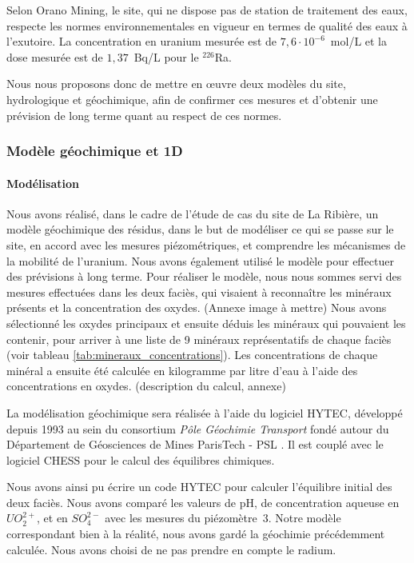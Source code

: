 \documentclass{article}
\begin{document}
Selon Orano Mining, le site, qui ne dispose pas de station de traitement des eaux, respecte les normes environnementales en vigueur en termes de qualité des eaux à l’exutoire. La concentration en uranium mesurée est de $7,6 \cdot 10^{-6}$~mol/L et la dose mesurée est de $1,37$~Bq/L pour le $^{226}$Ra.

Nous nous proposons donc de mettre en œuvre deux modèles du site, hydrologique et géochimique, afin de confirmer ces mesures et d’obtenir une prévision de long terme quant au respect de ces normes. 

\subsubsection{Modèle géochimique et 1D}
\paragraph{Modélisation}


Nous avons réalisé, dans le cadre de l’étude de cas du site de La Ribière, un modèle géochimique des résidus, dans le but de modéliser ce qui se passe sur le site, en accord avec les mesures piézométriques, et comprendre les mécanismes de la mobilité de l’uranium. Nous avons également utilisé le modèle pour effectuer des prévisions à long terme.
Pour réaliser le modèle, nous nous sommes servi des mesures effectuées dans les deux faciès, qui visaient à reconnaître les minéraux présents et la concentration des oxydes. (Annexe image à mettre) Nous avons sélectionné les oxydes principaux et ensuite déduis les minéraux qui pouvaient les contenir, pour arriver à une liste de 9 minéraux représentatifs de chaque faciès (voir tableau \ref{tab:mineraux_concentrations}). Les concentrations de chaque minéral a ensuite été calculée en kilogramme par litre d’eau à l’aide des concentrations en oxydes. (description du calcul, annexe) 


La modélisation géochimique sera réalisée à l'aide du logiciel HYTEC, développé depuis 1993 au sein du consortium \emph{Pôle Géochimie Transport} fondé autour du Département de Géosciences de Mines ParisTech - PSL \cite{site_hytec_hydrodynamique_nodate}. Il est couplé avec le logiciel CHESS \cite{lagneau:hal-00614306} pour le calcul des équilibres chimiques. 
	
Nous avons ainsi pu écrire un code HYTEC pour calculer l’équilibre initial des deux faciès. Nous avons comparé les valeurs de pH, de concentration aqueuse en $UO_2^{2+}$, et en $SO_4^{2-}$ avec les mesures du piézomètre~3. Notre modèle correspondant bien à la réalité, nous avons gardé la géochimie précédemment calculée. Nous avons choisi de ne pas prendre en compte le radium.
	
\end{document}
